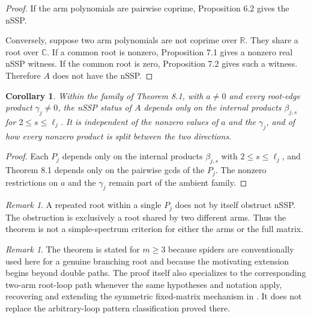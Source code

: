 \documentclass[11pt]{article}
\newtheorem{corollary}[theorem]{Corollary}
\theoremstyle{remark}
\newtheorem{remark}[theorem]{Remark}
\begin{document}
\begin{proof}

If the arm polynomials are pairwise coprime, Proposition 6.2 gives the nSSP.

Conversely, suppose two arm polynomials are not coprime over $\mathbb R$. They share a root over $\mathbb C$. If a common root is nonzero, Proposition 7.1 gives a nonzero real nSSP witness. If the common root is zero, Proposition 7.2 gives such a witness. Therefore $A$ does not have the nSSP.
\end{proof}

\begin{corollary}

Within the family of Theorem 8.1, with $a\ne0$ and every root-edge product $\gamma_j\ne0$, the nSSP status of $A$ depends only on the internal products $\beta_{j,s}$ for $2\le s\le\ell_j$. It is independent of the nonzero values of $a$ and the $\gamma_j$, and of how every nonzero product is split between the two directions.
\end{corollary}

\begin{proof}

Each $P_j$ depends only on the internal products $\beta_{j,s}$ with $2\le s\le\ell_j$, and Theorem 8.1 depends only on the pairwise gcds of the $P_j$. The nonzero restrictions on $a$ and the $\gamma_j$ remain part of the ambient family.
\end{proof}

\begin{remark}

A repeated root within a single $P_j$ does not by itself obstruct nSSP. The obstruction is exclusively a root shared by two different arms. Thus the theorem is not a simple-spectrum criterion for either the arms or the full matrix.
\end{remark}

\begin{remark}

The theorem is stated for $m\ge3$ because spiders are conventionally used here for a genuine branching root and because the motivating extension begins beyond double paths. The proof itself also specializes to the corresponding two-arm root-loop path whenever the same hypotheses and notation apply, recovering and extending the symmetric fixed-matrix mechanism in \cite{ref11}. It does not replace the arbitrary-loop pattern classification proved there.
\end{remark}
\end{document}
